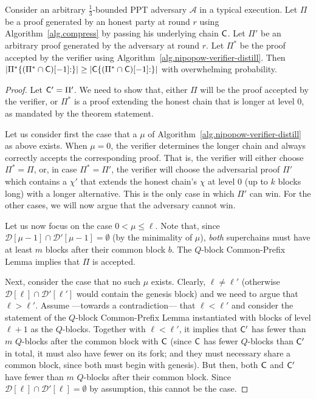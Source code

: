 \begin{theorem}[Security]\label{thm.miner.security}
	Consider an arbitrary $\frac{1}{3}$-bounded PPT adversary $\mathcal{A}$
	in a typical execution. Let $\Pi$ be a proof generated by an honest
	party at round $r$ using Algorithm~\ref{alg.compress} by passing his underlying chain $\mathsf{C}$.
	Let $\Pi'$ be an arbitrary proof generated by the adversary at round $r$.
	Let $\Pi^*$ be the proof accepted by the verifier using
	Algorithm~\ref{alg.nipopow-verifier-distill}.
	Then
	$|\Pi^*\{(\Pi^* \cap \mathsf{C})[-1]{:}\}| \geq
	 |\mathsf{C}\{(\Pi^* \cap \mathsf{C})[-1]{:}\}|$
	with overwhelming probability.
\end{theorem}
\begin{proof}
	Let $\mathsf{C}' = \Pi'$.
	We need to show that, either $\Pi$ will be the proof accepted by the verifier,
	or $\Pi^*$ is a proof extending the honest chain that is longer at level $0$,
	as mandated by the theorem statement.

	Let us consider first the case that a $\mu$ of Algorithm~\ref{alg.nipopow-verifier-distill} as above exists.
	When $\mu=0$, the verifier determines the longer chain and always
	correctly accepts the corresponding proof. That is, the verifier will
	either choose $\Pi^* = \Pi$, or, in case $\Pi^* = \Pi'$, the verifier
	will choose the adversarial proof $\Pi'$ which contains a $\chi'$ that extends the honest
	chain's $\chi$ at level $0$ (up to $k$ blocks long) with a longer alternative.
	This is the only case in which $\Pi'$ can win. For the other cases, we will
	now argue that the adversary cannot win.

	Let us now focus on the case $0<\mu\leq\ell$.
	Note that, since $\mathcal{D}[\mu-1]\cap\mathcal{D}'[\mu-1]=\emptyset$
	(by the minimality of $\mu$), \emph{both}
	superchains must have at least $m$ blocks after their common block $b$.
	The $Q$-block Common-Prefix Lemma implies that $\Pi$ is accepted.

	Next, consider the case that no such $\mu$ exists.
	Clearly, $\ell\ne\ell'$ (otherwise $\mathcal{D}[\ell]\cap\mathcal{D}'[\ell']$ would
	contain the genesis block) and we need to argue that $\ell>\ell'$.
	Assume ---towards a contradiction--- that $\ell<\ell'$ and consider the
	statement of the $Q$-block Common-Prefix Lemma instantiated with blocks of
	level $\ell+1$ as the $Q$-blocks.
	Together with $\ell<\ell'$, it implies that $\mathsf{C}'$ has fewer than $m$
	$Q$-blocks after the common block with $\mathsf{C}$ (since $\mathsf{C}$ has fewer
	$Q$-blocks than $\mathsf{C}'$ in total, it must also have fewer on its fork;
	and they must necessary share a common block, since both must begin
	with genesis).
	But then, both $\mathsf{C}$ and $\mathsf{C}'$ have fewer than $m$ $Q$-blocks after
	their common block. Since $\mathcal{D}[\ell]\cap\mathcal{D}'[\ell]=\emptyset$
	by assumption, this cannot be the case.
\end{proof}

